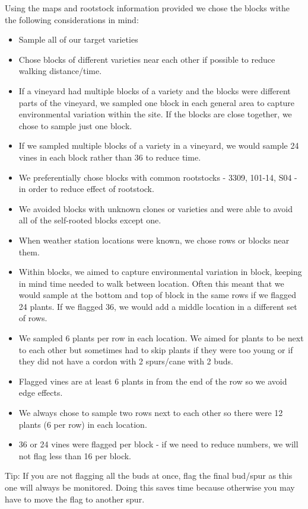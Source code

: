 \documentclass[11pt,letter]{article}
\newenvironment{smitemize}{
\begin{itemize}
  \setlength{\itemsep}{0pt}
  \setlength{\parskip}{0.8pt}
  \setlength{\parsep}{0pt}}
{\end{itemize}
}
\begin{document}
Using the maps and rootstock information provided we chose the blocks withe the following considerations in mind:
\begin{smitemize}
\item Sample all of our target varieties
\item Chose blocks of different varieties near each other if possible to reduce walking distance/time. 
\item If a vineyard had multiple blocks of a variety and the blocks were different parts of the vineyard, we sampled one block in each general area to capture environmental variation within the site. If the blocks are close together, we chose to sample just one block.
\item If we sampled multiple blocks of a variety in a vineyard, we would sample 24 vines in each block rather than 36 to reduce time.
\item We preferentially chose blocks with common rootstocks - 3309, 101-14, S04 - in order to reduce effect of rootstock.
\item We avoided blocks with unknown clones or varieties and were able to avoid all of the self-rooted blocks except one.
\item When weather station locations were known, we chose rows or blocks near them.
\item Within blocks, we aimed to capture environmental variation in block, keeping in mind time needed to walk between location. Often this meant that we would sample at the bottom and top of block in the same rows if we flagged 24 plants. If we flagged 36, we would add a middle location in a different set of rows. 
\item We sampled 6 plants per row in each location. We aimed for plants to be next to each other but sometimes had to skip plants if they were too young or if they did not have a cordon with 2 spurs/cane with 2 buds.
\item Flagged vines are at least 6 plants in from the end of the row so we avoid edge effects.
\item We always chose to sample two rows next to each other so there were 12 plants (6 per row) in each location.
\item 36 or 24 vines were flagged per block - if we need to reduce numbers, we will not flag less than 16 per block.

\end{smitemize}

Tip: If you are not flagging all the buds at once, flag the final bud/spur as this one will always be monitored. Doing this saves time because otherwise you may have to move the flag to another spur.
\end{document}
